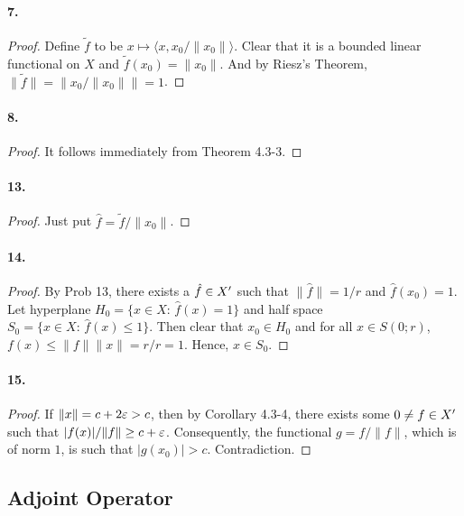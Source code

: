   \paragraph{7.}
  \begin{proof}
    Define $\tilde{f}$ to be $x\mapsto\langle x, x_0/\|x_0\|\rangle$. Clear that
    it is a bounded linear functional on $X$ and $\tilde{f}(x_0)=\|x_0\|$. And
    by Riesz's Theorem, $\|\tilde{f}\|=\|x_0/\|x_0\|\|=1$.
  \end{proof}
  
  \paragraph{8.}
  \begin{proof}
    It follows immediately from Theorem 4.3-3.
  \end{proof}
  
  \paragraph{13.}
  \begin{proof}
    Just put $\hat{f}=\tilde{f}/\|x_0\|$.
  \end{proof}
  
  \paragraph{14.}
  \begin{proof}
    By Prob 13, there exists a $\hat{f}\in X^\prime$ such that $\|\hat{f}\|=1/r$ and
    $\hat{f}(x_0)=1$. Let hyperplane $H_0=\{x\in X:\, \hat{f}(x)=1\}$ and half
    space $S_0=\{x\in X:\, \hat{f}(x)\le 1\}$. Then clear that $x_0\in H_0$ and
    for all $x\in S(0;r)$, $f(x) \le \|f\|\|x\| = r/r =1$. Hence, $x\in S_0$.
  \end{proof}
  
  \paragraph{15.}
  \begin{proof}
    If $\|x\|=c+2\varepsilon>c$, then by Corollary 4.3-4, there exists some $0\ne f\in
    X^\prime$ such that $|f(x)|/\|f\|\ge c+\varepsilon$. Consequently, the functional $g=f/
    \|f\|$, which is of norm $1$, is such that $|g(x_0)|>c$. Contradiction.
  \end{proof}
\setcounter{subsection}{4}
\subsection{Adjoint Operator}
